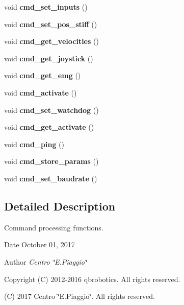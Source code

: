 \begin{DoxyCompactItemize}
\mbox{\label{command__processing_8h_a2d8a4542f55af960a27f875b00aad6a1}} 
void {\bfseries cmd\+\_\+set\+\_\+inputs} ()
\item 
\mbox{\label{command__processing_8h_a7897817859ac33d5a20b710af0f6a044}} 
void {\bfseries cmd\+\_\+set\+\_\+pos\+\_\+stiff} ()
\item 
\mbox{\label{command__processing_8h_a212883283bd7a8f32846615271cad8ce}} 
void {\bfseries cmd\+\_\+get\+\_\+velocities} ()
\item 
\mbox{\label{command__processing_8h_a09b189bd1592a8f95769a1907f44b555}} 
void {\bfseries cmd\+\_\+get\+\_\+joystick} ()
\item 
\mbox{\label{command__processing_8h_ae579c6ac56fef33632f9c9f2c42b90a0}} 
void {\bfseries cmd\+\_\+get\+\_\+emg} ()
\item 
\mbox{\label{command__processing_8h_a107fc9f2982f9a953bdd82aa07279499}} 
void {\bfseries cmd\+\_\+activate} ()
\item 
\mbox{\label{command__processing_8h_aa94cd9c2e2fbfc5b98e84f67569cfe82}} 
void {\bfseries cmd\+\_\+set\+\_\+watchdog} ()
\item 
\mbox{\label{command__processing_8h_a554d563001517bfbc44400a1e999b393}} 
void {\bfseries cmd\+\_\+get\+\_\+activate} ()
\item 
\mbox{\label{command__processing_8h_a704f8c8cb0f4d75f243fc2b79bc34188}} 
void {\bfseries cmd\+\_\+ping} ()
\item 
\mbox{\label{command__processing_8h_a1a2493bfc2f30171d7e7a3bd5aebab14}} 
void {\bfseries cmd\+\_\+store\+\_\+params} ()
\item 
\mbox{\label{command__processing_8h_aa86bf1f2fa69ab5927f7e4e40eb40581}} 
void {\bfseries cmd\+\_\+set\+\_\+baudrate} ()
\end{DoxyCompactItemize}


\subsection{Detailed Description}
Command processing functions. 

\begin{DoxyDate}{Date}
October 01, 2017 
\end{DoxyDate}
\begin{DoxyAuthor}{Author}
{\itshape Centro \char`\"{}\+E.\+Piaggio\char`\"{}} 
\end{DoxyAuthor}
\begin{DoxyCopyright}{Copyright}
(C) 2012-\/2016 qbrobotics. All rights reserved. 

(C) 2017 Centro \char`\"{}\+E.\+Piaggio\char`\"{}. All rights reserved. 
\end{DoxyCopyright}


